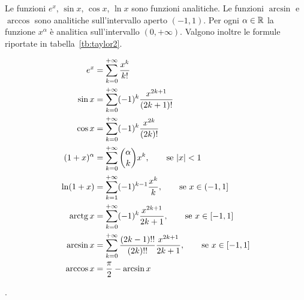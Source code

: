 \begin{theorem}
  \label{th:serie_taylor}
  Le funzioni $e^x$, $\sin x$, $\cos x$, $\ln x$ sono funzioni
  analitiche. Le funzioni $\arcsin$ e $\arccos$ sono analitiche sull'intervallo
  aperto $(-1,1)$. Per ogni $\alpha \in {\mathbb R}$
  la funzione $x^\alpha$ è analitica sull'intervallo $(0,+\infty)$.
  Valgono inoltre le formule riportate in tabella~\ref{tb:taylor2}.
\end{theorem}
%
\begin{table}
\begin{align*}
e^x &= \sum_{k=0}^{+\infty} \frac{x^k}{k!}\\
\sin x &= \sum_{k=0}^{+\infty} (-1)^k\frac{x^{2k+1}}{(2k+1)!}\\
\cos x &= \sum_{k=0}^{+\infty} (-1)^k\frac{x^{2k}}{(2k)!}\\
(1+x)^\alpha &= \sum_{k=0}^{+\infty} {\alpha \choose k} x^k, \qquad \text{se ${\left|x\right|}<1$} \\
\ln (1+x) &= \sum_{k=1}^{+\infty} (-1)^{k-1} \frac{x^k}{k}, \qquad \text{se $x\in(-1,1]$} \\
\operatorname{arctg} x &= \sum_{k=0}^{+\infty} (-1)^k \frac{x^{2k+1}}{2k+1}, \qquad \text{se $x\in [-1,1]$} \\
\arcsin x &= \sum_{k=0}^{+\infty} \frac{(2k-1)!!}{(2k)!!} \frac{x^{2k+1}}{2k+1}, 
  \qquad \text{se $x\in[-1,1]$} \\
\arccos x &= \frac \pi 2 - \arcsin x
\end{align*}
\caption{sviluppi in serie di Taylor, di alcune funzioni elementari.
%
%
Si veda il teorema~\ref{th:serie_taylor}}.
\label{tb:taylor2}%
\end{table}
%
